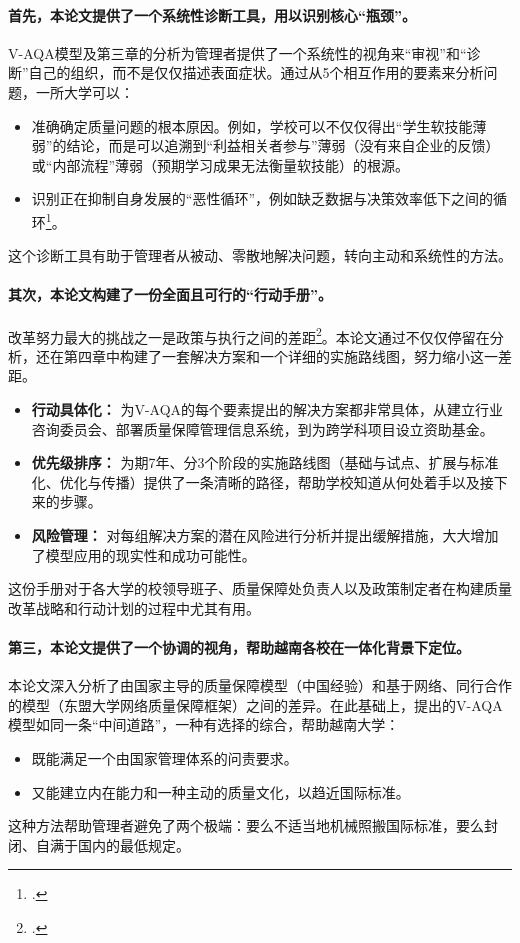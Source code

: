 \paragraph{首先，本论文提供了一个系统性诊断工具，用以识别核心“瓶颈”。}
V-AQA模型及第三章的分析为管理者提供了一个系统性的视角来“审视”和“诊断”自己的组织，而不是仅仅描述表面症状。通过从5个相互作用的要素来分析问题，一所大学可以：
\begin{itemize}
    \item 准确确定质量问题的根本原因。例如，学校可以不仅仅得出“学生软技能薄弱”的结论，而是可以追溯到“利益相关者参与”薄弱（没有来自企业的反馈）或“内部流程”薄弱（预期学习成果无法衡量软技能）的根源。
    \item 识别正在抑制自身发展的“恶性循环”，例如缺乏数据与决策效率低下之间的循环\footcite{aunsec_redesigningIQA}。
\end{itemize}
这个诊断工具有助于管理者从被动、零散地解决问题，转向主动和系统性的方法。

\paragraph{其次，本论文构建了一份全面且可行的“行动手册”。}
改革努力最大的挑战之一是政策与执行之间的差距\footcite{OECD_PolicyToAction}。本论文通过不仅仅停留在分析，还在第四章中构建了一套解决方案和一个详细的实施路线图，努力缩小这一差距。
\begin{itemize}
    \item \textbf{行动具体化：} 为V-AQA的每个要素提出的解决方案都非常具体，从建立行业咨询委员会、部署质量保障管理信息系统，到为跨学科项目设立资助基金。
    \item \textbf{优先级排序：} 为期7年、分3个阶段的实施路线图（基础与试点、扩展与标准化、优化与传播）提供了一条清晰的路径，帮助学校知道从何处着手以及接下来的步骤。
    \item \textbf{风险管理：} 对每组解决方案的潜在风险进行分析并提出缓解措施，大大增加了模型应用的现实性和成功可能性。
\end{itemize}
这份手册对于各大学的校领导班子、质量保障处负责人以及政策制定者在构建质量改革战略和行动计划的过程中尤其有用。

\paragraph{第三，本论文提供了一个协调的视角，帮助越南各校在一体化背景下定位。}
本论文深入分析了由国家主导的质量保障模型（中国经验）和基于网络、同行合作的模型（东盟大学网络质量保障框架）之间的差异。在此基础上，提出的V-AQA模型如同一条“中间道路”，一种有选择的综合，帮助越南大学：
\begin{itemize}
    \item 既能满足一个由国家管理体系的问责要求。
    \item 又能建立内在能力和一种主动的质量文化，以趋近国际标准。
\end{itemize}
这种方法帮助管理者避免了两个极端：要么不适当地机械照搬国际标准，要么封闭、自满于国内的最低规定。

